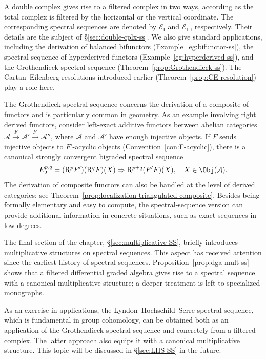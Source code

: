 A double complex gives rise to a filtered complex in two ways, according as
the total complex is filtered by the horizontal or the vertical coordinate.
The corresponding spectral sequences are denoted by
$\mathscr{E}_{\mathrm{I}}$ and $\mathscr{E}_{\mathrm{II}}$, respectively.
Their details are the subject of \S\ref{sec:double-cplx-ss}. We also give
standard applications, including the derivation of balanced bifunctors
(Example~\ref{eg:bifunctor-ss}), the spectral sequence of hyperderived functors
(Example~\ref{eg:hyperderived-ss}), and the Grothendieck spectral sequence
(Theorem~\ref{prop:Grothendieck-ss}). The Cartan--Eilenberg resolutions
introduced earlier (Theorem~\ref{prop:CE-resolution}) play a role here.

The Grothendieck spectral sequence concerns the derivation of a composite of
functors and is particularly common in geometry. As an example involving right
derived functors, consider left-exact additive functors between abelian
categories
$\mathcal{A}\xrightarrow{F}\mathcal{A}'\xrightarrow{F'}\mathcal{A}''$,
where $\mathcal{A}$ and $\mathcal{A}'$ have enough injective objects. If $F$
sends injective objects to $F'$-acyclic objects
(Convention~\ref{con:F-acyclic}), there is a canonical strongly convergent
bigraded spectral sequence
\[ E_2^{p, q} = (\mathrm{R}^p F') (\mathrm{R}^q F)(X) \Rightarrow \mathrm{R}^{p+q}(F' F)(X), \quad X \in \Obj(\mathcal{A}). \]
The derivation of composite functors can also be handled at the level of
derived categories; see
Theorem~\ref{prop:localization-triangulated-composite}. Besides being formally
elementary and easy to compute, the spectral-sequence version can provide
additional information in concrete situations, such as exact sequences in low
degrees.

The final section of the chapter, \S\ref{sec:multiplicative-SS}, briefly
introduces multiplicative structures on spectral sequences. This aspect has
received attention since the earliest history of spectral sequences.
Proposition~\ref{prop:dga-mult-ss} shows that a filtered differential graded
algebra gives rise to a spectral sequence with a canonical multiplicative
structure; a deeper treatment is left to specialized monographs.

As an exercise in applications, the Lyndon--Hochschild--Serre spectral
sequence, which is fundamental in group cohomology, can be obtained both as an
application of the Grothendieck spectral sequence and concretely from a
filtered complex. The latter approach also equips it with a canonical
multiplicative structure. This topic will be discussed in
\S\ref{sec:LHS-SS} in the future.

